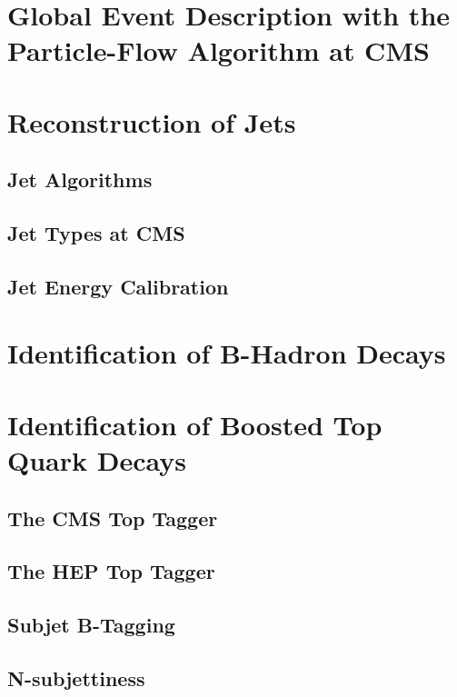 \section{Global Event Description with the Particle-Flow Algorithm at CMS}
\label{sec:pf_algo}

\section{Reconstruction of Jets}
\label{sec:jets_reco}

\subsection{Jet Algorithms}
\label{subsec:jets_algos}

\subsection{Jet Types at CMS}
\label{subsec:jets_types}

\subsection{Jet Energy Calibration}
\label{subsec:jets_calib}

\section{Identification of B-Hadron Decays}
\label{sec:btagging}

\section{Identification of Boosted Top Quark Decays}
\label{sec:boosted_tops}

\subsection{The CMS Top Tagger}
\label{sec:boosted_tops_cms_tagger}

\subsection{The HEP Top Tagger}
\label{sec:boosted_tops_hep_top_tagger}

\subsection{Subjet B-Tagging}
\label{sec:boosted_tops_subjet_b}

\subsection{N-subjettiness}
\label{sec:boosted_tops_n_subjettiness}
